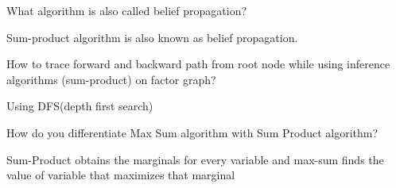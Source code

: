 \documentclass[addpoints]{exam}
\begin{document}
\begin{questions}
\question[0]
What algorithm is also called belief propagation?
\begin{solutionordottedlines}[1in]
Sum-product algorithm is also known as belief propagation.
\end{solutionordottedlines}

\question[0]
How to trace forward and backward path from root node while using inference algorithms (sum-product) on factor graph?
\begin{solutionordottedlines}[1in]
Using DFS(depth first search)
\end{solutionordottedlines}

\question[0]
How do you differentiate Max Sum algorithm with Sum Product algorithm?
\begin{solutionordottedlines}[1in]
Sum-Product obtains the marginals for every variable and max-sum finds the value of variable that maximizes that marginal
\end{solutionordottedlines}

\end{questions}
\end{document}

